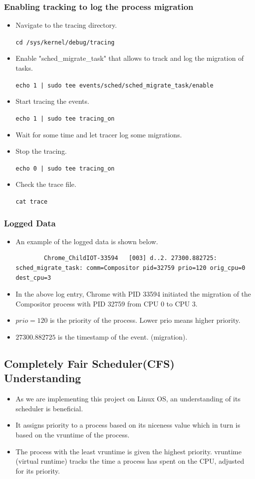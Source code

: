 \documentclass[12pt]{article}
\begin{document}
\subsubsection{Enabling tracking to log the process migration}
\begin{itemize}
    \item Navigate to the tracing directory. 
    
    \texttt{cd /sys/kernel/debug/tracing}
    \item Enable "sched\_migrate\_task" that allows to track and log the migration of tasks.

    \texttt{echo 1 | sudo tee events/sched/sched_migrate_task/enable}
    \item Start tracing the events. 
    
    \texttt{echo 1 | sudo tee tracing_on}
    \item Wait for some time and let tracer log some migrations.
    \item Stop the tracing. 
    
    \texttt{echo 0 | sudo tee tracing_on}
    \item Check the trace file. 
    
    \texttt{cat trace}
\end{itemize}
\subsubsection{Logged Data}
\begin{itemize}
    \item An example of the logged data is shown below.
    \begin{verbatim} 
        Chrome_ChildIOT-33594   [003] d..2. 27300.882725: sched_migrate_task: comm=Compositor pid=32759 prio=120 orig_cpu=0 dest_cpu=3
    \end{verbatim}
    \item In the above log entry, Chrome with PID 33594 initiated the migration of the Compositor process with PID 32759 from CPU 0 to CPU 3.
    \item $prio =120$ is the priority of the process. Lower prio means higher priority.
    \item $27300.882725$ is the timestamp of the event. (migration).
\end{itemize}
\subsection{Completely Fair Scheduler(CFS) Understanding}
\begin{itemize}
    \item As we are implementing this project on Linux OS, an understanding of its scheduler is beneficial.
    \item It assigns priority to a process based on its niceness value which in turn is based on the vruntime of the process.
    \item The process with the least vruntime is given the highest priority. vruntime (virtual runtime) tracks the time a process has spent on the CPU, adjusted for its priority.
\end{itemize}
\end{document}
